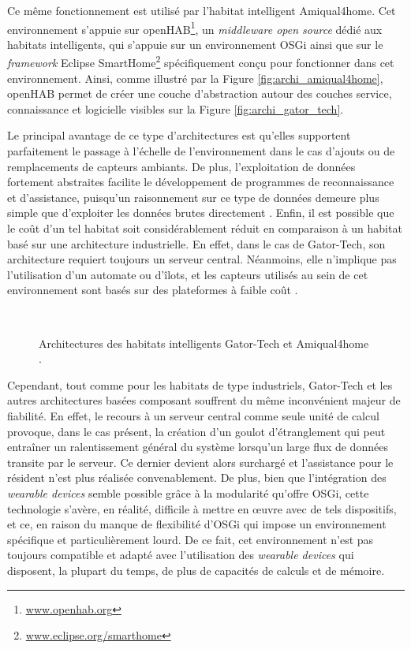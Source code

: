 Ce même fonctionnement est utilisé par l'habitat intelligent Amiqual4home. Cet environnement s'appuie sur \ac{openHAB}\footnote{\url{www.openhab.org}}, un \textit{middleware open source} dédié aux habitats intelligents, qui s'appuie sur un environnement \acs{OSGi} ainsi que sur le \textit{framework} Eclipse SmartHome\footnote{\url{www.eclipse.org/smarthome}} spécifiquement conçu pour fonctionner dans cet environnement. Ainsi, comme illustré par la Figure \ref{fig:archi_amiqual4home}, \acs{openHAB} permet de créer une couche d'abstraction autour des couches service, connaissance et logicielle visibles sur la Figure \ref{fig:archi_gator_tech}.

Le principal avantage de ce type d'architectures est qu'elles supportent parfaitement le passage à l'échelle de l'environnement dans le cas d'ajouts ou de remplacements de capteurs ambiants. De plus, l'exploitation de données fortement abstraites facilite le développement de programmes de reconnaissance et d'assistance, puisqu'un raisonnement sur ce type de données demeure plus simple que d'exploiter les données brutes directement \citep{Helal2005}. Enfin, il est possible que le coût d'un tel habitat soit considérablement réduit en comparaison à un habitat basé sur une architecture industrielle. En effet, dans le cas de Gator-Tech, son architecture requiert toujours un serveur central. Néanmoins, elle n'implique pas l'utilisation d'un automate ou d'îlots, et les capteurs utilisés au sein de cet environnement sont basés sur des plateformes à faible coût \citep{Helal2005}.

\begin{figure}[H]
	\centering
	\\[20pt]
	\caption[Architectures des habitats intelligents Gator-Tech et Amiqual4home.]{Architectures des habitats intelligents Gator-Tech \citep{Helal2005} et Amiqual4home \citep{Lago2017}.}
\end{figure}

Cependant, tout comme pour les habitats de type industriels, Gator-Tech et les autres architectures basées composant souffrent du même inconvénient majeur de fiabilité. En effet, le recours à un serveur central comme seule unité de calcul provoque, dans le cas présent, la création d'un goulot d'étranglement qui peut entraîner un ralentissement général du système lorsqu'un large flux de données transite par le serveur. Ce dernier devient alors surchargé et l'assistance pour le résident n'est plus réalisée convenablement. De plus, bien que l'intégration des \textit{wearable devices} semble possible grâce à la modularité qu'offre \acs{OSGi}, cette technologie s'avère, en réalité, difficile à mettre en \oe{}uvre avec de tels dispositifs, et ce, en raison du manque de flexibilité d'\acs{OSGi} qui impose un environnement spécifique et particulièrement lourd. De ce fait, cet environnement n'est pas toujours compatible et adapté avec l'utilisation des \textit{wearable devices} qui disposent, la plupart du temps, de plus de capacités de calculs et de mémoire.


